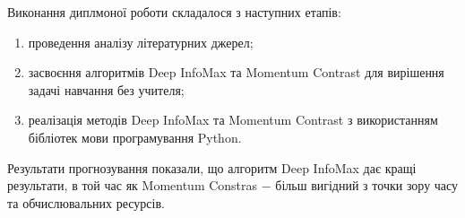\label{sec:Summary}

\hspace*{26pt} Виконання диплмоної роботи складалося з наступних етапів:

\begin{enumerate}
	\item проведення аналізу літературних джерел;
	\item засвоєння алгоритмів Deep InfoMax та Momentum Contrast для вирішення задачі навчання без учителя;
	\item реалізація методів Deep InfoMax та Momentum Contrast з використанням бібліотек мови програмування Python.
\end{enumerate}

Результати прогнозування показали, що алгоритм Deep InfoMax дає кращі результати, в той час як Momentum Constras $-$ більш вигідний з точки зору часу та обчислювальних ресурсів.
